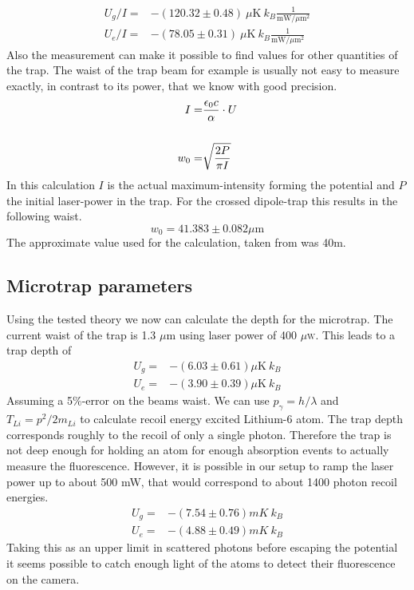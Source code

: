 \begin{align}
U_g/I=&-(120.32\pm 0.48)\ \mu\mathrm{K}\ k_B\frac{1}{\mathrm{mW}/\mu \mathrm{m}^2}\\
U_e/I=&-(78.05\pm 0.31)\ \mu\mathrm{K}\ k_B\frac{1}{\mathrm{mW}/\mu \mathrm{m}^2}
\end{align}
Also the measurement can make it possible to find values for other quantities of the trap. The waist of the trap beam for example is usually not easy to measure exactly, in contrast to its power, that we know with good precision.
\begin{align}
I=&\frac{\epsilon_0 c}{\alpha}\cdot U\\\notag\\
w_0=&\sqrt{\frac{2P}{\pi I}}
\end{align}
In this calculation $I$ is the actual maximum-intensity forming the potential and $P$ the initial laser-power in the trap. For the crossed dipole-trap this results in the following waist.
\begin{equation}
w_0=41.383\pm 0.082 \mu \mathrm{m}
\end{equation}
The approximate value used for the calculation, taken from \cite{lompe} was 40\mu m.

\subsection{Microtrap parameters}

Using the tested theory we now can calculate the depth for the microtrap. The current waist of the trap is 1.3 $\mu$m using laser power of 400 $\mu$\textsc{w}. This leads to a trap depth of
\begin{align}
U_g=&-(6.03\pm 0.61)\mu\mathrm{K}\ k_B\\
U_e=&-(3.90\pm 0.39)\mu\mathrm{K}\ k_B
\end{align}
Assuming a 5\%-error on the beams waist. We can use $p_\gamma=h/\lambda$ and $T_{Li}=p^2/2m_{Li}$ to calculate recoil energy excited Lithium-6 atom. The trap depth corresponds roughly to the recoil of only a single photon. Therefore the trap is not deep enough for holding an atom for enough absorption events to actually measure the fluorescence. However, it is possible in our setup to ramp the laser power up to about 500 mW, that would correspond to about 1400 photon recoil energies.
\begin{align}
U_g=&-(7.54\pm 0.76)\unit{mK}\ k_B\\
U_e=&-(4.88\pm 0.49)\unit{mK}\ k_B
\end{align}
Taking this as an upper limit in scattered photons before escaping the potential it seems possible to catch enough light of the atoms to detect their fluorescence on the camera. 

